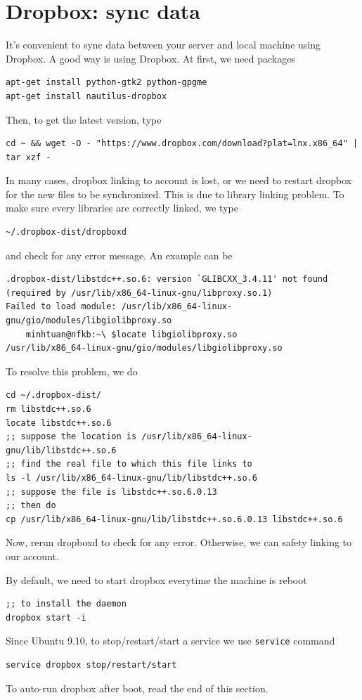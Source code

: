 \section{Dropbox: sync data}
\label{sec:Dropbox}

It's convenient to sync data between your server and local machine using
Dropbox. A good way is using Dropbox. At first, we need packages
\begin{verbatim}
apt-get install python-gtk2 python-gpgme
apt-get install nautilus-dropbox
\end{verbatim}
Then, to get the latest version, type
\begin{verbatim}
cd ~ && wget -O - "https://www.dropbox.com/download?plat=lnx.x86_64" | tar xzf -
\end{verbatim}
% 

In many cases, dropbox linking to account is lost, or we need to restart dropbox
for the new files to be synchronized. This is due to library linking problem. To
make sure every libraries are correctly linked, we type
\begin{verbatim}
~/.dropbox-dist/dropboxd
\end{verbatim}
and check for any error message. An example can be
\begin{verbatim}
.dropbox-dist/libstdc++.so.6: version `GLIBCXX_3.4.11' not found 
(required by /usr/lib/x86_64-linux-gnu/libproxy.so.1)
Failed to load module: /usr/lib/x86_64-linux-gnu/gio/modules/libgiolibproxy.so
	minhtuan@nfkb:~\ $locate libgiolibproxy.so
/usr/lib/x86_64-linux-gnu/gio/modules/libgiolibproxy.so
\end{verbatim}

To resolve this problem, we do
\begin{verbatim}
cd ~/.dropbox-dist/
rm libstdc++.so.6
locate libstdc++.so.6
;; suppose the location is /usr/lib/x86_64-linux-gnu/lib/libstdc++.so.6
;; find the real file to which this file links to
ls -l /usr/lib/x86_64-linux-gnu/lib/libstdc++.so.6
;; suppose the file is libstdc++.so.6.0.13
;; then do
cp /usr/lib/x86_64-linux-gnu/lib/libstdc++.so.6.0.13 libstdc++.so.6
\end{verbatim}
Now, rerun dropboxd to check for any error. Otherwise, we can safety linking to
our account.


By default, we need to start dropbox everytime the machine is reboot
\begin{verbatim}
;; to install the daemon
dropbox start -i
\end{verbatim}
Since Ubuntu 9.10, to stop/restart/start a service we use \verb!service! command
\begin{verbatim}
service dropbox stop/restart/start
\end{verbatim}
To auto-run dropbox after boot, read the end of this section.

